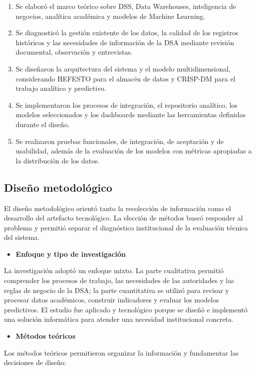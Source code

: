 \documentclass[11pt,oneside,openany]{book}
\begin{document}
\begin{enumerate}[leftmargin=*]
\item Se elaboró el marco teórico sobre DSS, Data Warehouses, inteligencia de negocios, analítica académica y modelos de Machine Learning.
\item Se diagnosticó la gestión existente de los datos, la calidad de los registros históricos y las necesidades de información de la DSA mediante revisión documental, observación y entrevistas.
\item Se diseñaron la arquitectura del sistema y el modelo multidimensional, considerando HEFESTO para el almacén de datos y CRISP-DM para el trabajo analítico y predictivo.
\item Se implementaron los procesos de integración, el repositorio analítico, los modelos seleccionados y los dashboards mediante las herramientas definidas durante el diseño.
\item Se realizaron pruebas funcionales, de integración, de aceptación y de usabilidad, además de la evaluación de los modelos con métricas apropiadas a la distribución de los datos.
\end{enumerate}
\subsection*{Diseño metodológico}

El diseño metodológico orientó tanto la recolección de información como el desarrollo del artefacto tecnológico. La elección de métodos buscó responder al problema y permitió separar el diagnóstico institucional de la evaluación técnica del sistema.

\begin{itemize}[leftmargin=*]
\item \textbf{Enfoque y tipo de investigación}
\end{itemize}
La investigación adoptó un enfoque mixto. La parte cualitativa permitió comprender los procesos de trabajo, las necesidades de las autoridades y las reglas de negocio de la DSA; la parte cuantitativa se utilizó para revisar y procesar datos académicos, construir indicadores y evaluar los modelos predictivos. El estudio fue aplicado y tecnológico porque se diseñó e implementó una solución informática para atender una necesidad institucional concreta.

\begin{itemize}[leftmargin=*]
\item \textbf{Métodos teóricos}
\end{itemize}
Los métodos teóricos permitieron organizar la información y fundamentar las decisiones de diseño:
\end{document}
